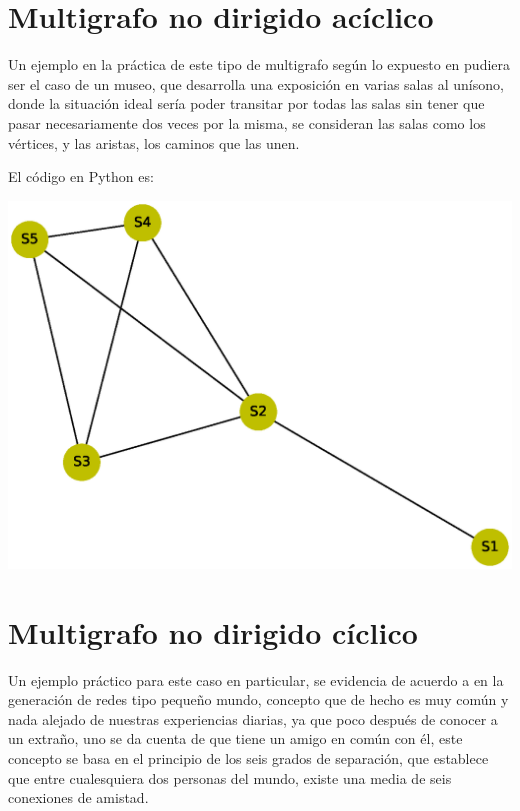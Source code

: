 \documentclass[10pt,a4paper]{article}
\begin{document}
\section{Multigrafo no dirigido acíclico}

Un ejemplo en la práctica de este tipo de multigrafo según lo expuesto en \cite{art4} pudiera ser el caso de un museo, que desarrolla una exposición en varias salas al unísono, donde la situación ideal sería poder transitar por todas las salas sin tener que pasar necesariamente dos veces por la misma, se consideran las salas como los vértices, y las aristas, los caminos que las unen.\newpage

El código en Python es:



\begin{center}

\includegraphics[scale=0.4]{MNDA}

\end{center}

\section{Multigrafo no dirigido cíclico}

Un ejemplo práctico para este caso en particular, se evidencia de acuerdo a \cite{art3} en la generación de redes tipo pequeño mundo, concepto que de hecho es muy común y nada alejado de nuestras experiencias diarias, ya que poco después de conocer a un extraño, uno se da cuenta de que tiene un amigo en común con él, este concepto se basa en el principio de los seis grados de separación, que establece que entre cualesquiera dos personas del mundo, existe una media de seis conexiones de amistad.\vspace{.4cm}
\end{document}
